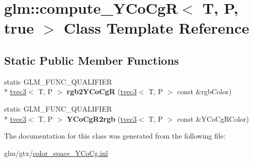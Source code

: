 \hypertarget{classglm_1_1compute__YCoCgR_3_01T_00_01P_00_01true_01_4}{\section{glm\-:\-:compute\-\_\-\-Y\-Co\-Cg\-R$<$ T, P, true $>$ Class Template Reference}
\label{classglm_1_1compute__YCoCgR_3_01T_00_01P_00_01true_01_4}
}
\subsection*{Static Public Member Functions}
\begin{DoxyCompactItemize}
\item 
\hypertarget{classglm_1_1compute__YCoCgR_3_01T_00_01P_00_01true_01_4_a82803505194346c9a8d9d17d770a8c45}{static G\-L\-M\-\_\-\-F\-U\-N\-C\-\_\-\-Q\-U\-A\-L\-I\-F\-I\-E\-R \\*
\hyperlink{structglm_1_1tvec3}{tvec3}$<$ T, P $>$ {\bfseries rgb2\-Y\-Co\-Cg\-R} (\hyperlink{structglm_1_1tvec3}{tvec3}$<$ T, P $>$ const \&rgb\-Color)}\label{classglm_1_1compute__YCoCgR_3_01T_00_01P_00_01true_01_4_a82803505194346c9a8d9d17d770a8c45}

\item 
\hypertarget{classglm_1_1compute__YCoCgR_3_01T_00_01P_00_01true_01_4_a06da2d71b6b47d04e9579eef10022cbb}{static G\-L\-M\-\_\-\-F\-U\-N\-C\-\_\-\-Q\-U\-A\-L\-I\-F\-I\-E\-R \\*
\hyperlink{structglm_1_1tvec3}{tvec3}$<$ T, P $>$ {\bfseries Y\-Co\-Cg\-R2rgb} (\hyperlink{structglm_1_1tvec3}{tvec3}$<$ T, P $>$ const \&Y\-Co\-Cg\-R\-Color)}\label{classglm_1_1compute__YCoCgR_3_01T_00_01P_00_01true_01_4_a06da2d71b6b47d04e9579eef10022cbb}

\end{DoxyCompactItemize}


The documentation for this class was generated from the following file\-:\begin{DoxyCompactItemize}
\item 
glm/gtx/\hyperlink{color__space__YCoCg_8inl}{color\-\_\-space\-\_\-\-Y\-Co\-Cg.\-inl}\end{DoxyCompactItemize}
